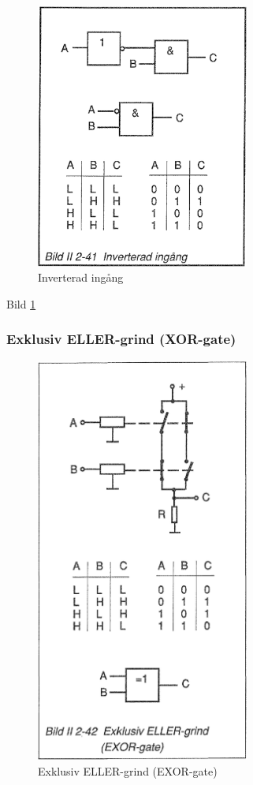 \begin{figure}[h]
\begin{center}
\includegraphics[width=7cm]{images/bild_2_2-41}
\caption{Inverterad ingång}
\label{fig:BildII2-41}
\end{center}
\end{figure}

Bild \ref{fig:BildII2-41}

\subsubsection{Exklusiv ELLER-grind (XOR-gate)}

\begin{figure}[h]
\begin{center}
\includegraphics[width=7cm]{images/bild_2_2-42}
\caption{Exklusiv ELLER-grind (EXOR-gate)}
\label{fig:BildII2-42}
\end{center}
\end{figure}

